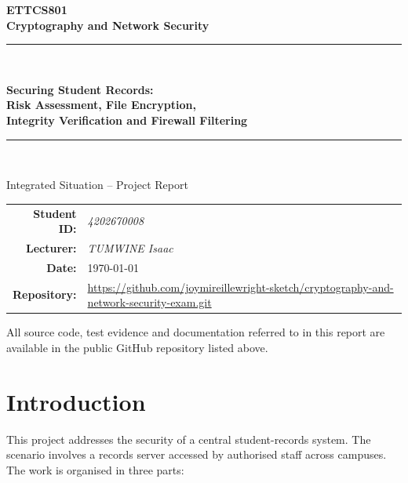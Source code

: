 \documentclass[11pt,a4paper]{article}
\begin{document}
\begin{titlepage}
\centering
\vspace*{2cm}
{\Large\bfseries ETTCS801\\[0.3cm] Cryptography and Network Security\par}
\vspace{1.2cm}
\rule{\textwidth}{1.2pt}\\[0.5cm]
{\Huge\bfseries Securing Student Records:\\[0.2cm]
Risk Assessment, File Encryption,\\[0.2cm]
Integrity Verification and Firewall Filtering\par}
\rule{\textwidth}{1.2pt}\\[1.5cm]

{\large Integrated Situation -- Project Report\par}
\vspace{2cm}

\begin{tabular}{rl}

  \textbf{Student ID:}  & \textit{4202670008} \\
  \textbf{Lecturer:}    & \textit{TUMWINE Isaac} \\
  \textbf{Date:}        & \today \\
  \textbf{Repository:}  & \url{https://github.com/joymireillewright-sketch/cryptography-and-network-security-exam.git}
\end{tabular}

\vfill
{\small All source code, test evidence and documentation referred to in this report
are available in the public GitHub repository listed above.\par}
\end{titlepage}

\tableofcontents
\newpage

\section{Introduction}
This project addresses the security of a central student-records system.
The scenario involves a records server accessed by authorised staff across
campuses. The work is organised in three parts:
\end{document}
